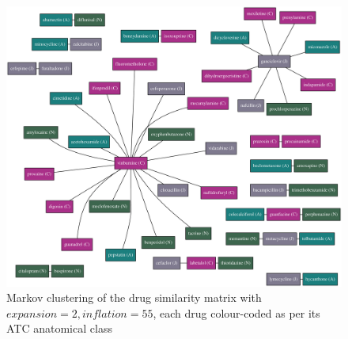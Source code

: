 \documentclass[12pt,a4paper,twoside,openright]{report}
\begin{document}
\begin{landscape}
\begin{figure}[!htb]
\includegraphics[height=\textwidth]{drug-cluster-3.eps}
\caption{Markov clustering of the drug similarity matrix with $\mathit{expansion}=2, \mathit{inflation}=55$, each drug colour-coded as per its ATC anatomical class}
\label{fig:drug-cluster}
\end{figure}

\end{landscape}
\end{document}
